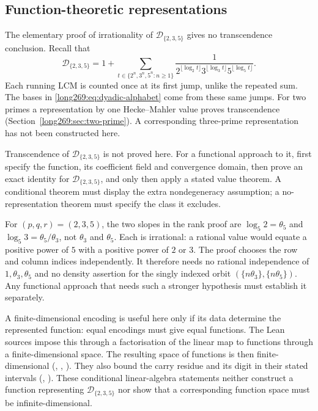 \documentclass[11pt]{article}
\theoremstyle{remark}
\theoremstyle{plain}
\begin{document}
\subsection{Function-theoretic representations}\label{long269:sec:function-representation}

The elementary proof of irrationality of $\mathcal D_{\{2,3,5\}}$ gives
no transcendence conclusion. Recall that
\[
 \mathcal D_{\{2,3,5\}}=1+
 \sum_{t\in\{2^n,3^n,5^n:n\ge1\}}
 \frac1{2^{\lfloor\log_2t\rfloor}3^{\lfloor\log_3t\rfloor}
             5^{\lfloor\log_5t\rfloor}}.
\]
Each running LCM is counted once at its first jump, unlike the repeated sum.
The bases in \eqref{long269:eq:dyadic-alphabet} come from these same jumps.
For two primes a representation by one Hecke--Mahler value proves
transcendence (Section~\ref{long269:sec:two-prime}). A corresponding
three-prime representation has not been constructed here.

\begin{problem}
\label{long269:prob:representation}
Transcendence of $\mathcal D_{\{2,3,5\}}$ is not proved here.  For a functional
approach to it, first specify the function, its coefficient field and
convergence domain, then prove an exact identity for $\mathcal D_{\{2,3,5\}}$,
and only then apply a stated value theorem.  A conditional theorem must
display the extra nondegeneracy assumption; a no-representation theorem
must specify the class it excludes.
\end{problem}

For $(p,q,r)=(2,3,5)$, the two slopes in the rank proof are
$\log_5 2=\theta_5$ and $\log_5 3=\theta_5/\theta_3$, not $\theta_3$ and
$\theta_5$.  Each is irrational: a rational value would equate a positive
power of $5$ with a positive power of $2$ or $3$.  The proof chooses the
row and column indices independently.  It therefore needs no rational
independence of $1,\theta_3,\theta_5$ and no density assertion for the
singly indexed orbit $(\{n\theta_3\},\{n\theta_5\})$.  Any functional
approach that needs such a stronger hypothesis must establish it separately.

A finite-dimensional encoding is useful here only if its data determine
the represented function: equal encodings must give equal functions.
The Lean sources impose this through a factorisation of the linear map
to functions through a finite-dimensional space. The resulting space of
functions is then finite-dimensional
(,
,
).  They also bound the carry residue and its digit in their
stated intervals
(,
).  These conditional linear-algebra statements neither construct a
function representing $\mathcal D_{\{2,3,5\}}$ nor show that a corresponding
function space must be infinite-dimensional.
\end{document}
